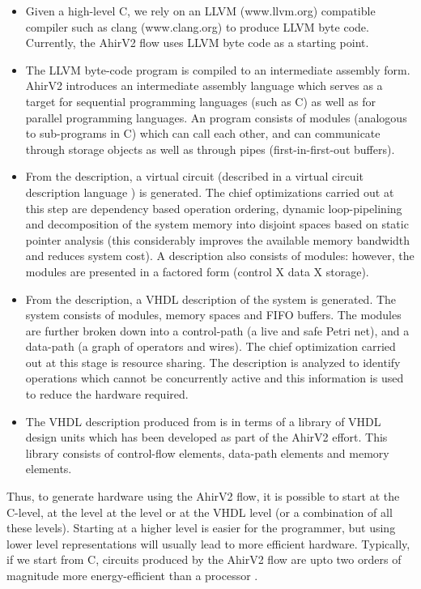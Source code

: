 \begin{itemize}
\item Given a high-level C, we rely on
an LLVM (www.llvm.org) compatible compiler such as clang (www.clang.org)
to produce LLVM byte code.
Currently, the AhirV2 flow uses LLVM byte code as a starting point.
\item The LLVM byte-code program is compiled
to an intermediate assembly form.  AhirV2
introduces an intermediate assembly language
\Aa  which serves as a target for sequential
programming languages (such as C) as
well as for parallel programming languages.
An \Aa program consists of modules (analogous
to sub-programs in C) which can call each 
other, and can communicate through storage objects
as well as through pipes (first-in-first-out buffers).
\item From the \Aa description, a virtual
circuit (described in a virtual circuit
description language \vC) is generated.
The chief optimizations carried out at this
step are dependency based operation
ordering, dynamic loop-pipelining and decomposition of the system memory
into disjoint spaces based on static pointer
analysis (this considerably improves the
available memory bandwidth and reduces
system cost).  A \vC description also
consists of modules: however, the modules
are presented in a factored form (control X data X storage).
\item From the \vC description, a
VHDL description of the system is generated.
The system consists of modules, memory spaces
and FIFO buffers.  The modules are further
broken down into a control-path (a live and safe
Petri net), and a data-path (a graph of operators
and wires).
The chief optimization carried out at this
stage is resource sharing.  The \vC description
is analyzed to identify operations which
cannot be concurrently active and this information
is used to reduce the hardware required.
\item 
The VHDL description produced from 
\vC is in terms of a library
of VHDL design units which has been developed
as part of the AhirV2  effort.  This library
consists of control-flow elements, data-path
elements and memory elements.
\end{itemize}

Thus, to generate hardware using the AhirV2 flow,
it is possible to start at the C-level, at the \Aa level
at the \vC level or at the VHDL level (or a combination
of all these levels).  Starting at a higher level is
easier for the programmer, but using lower level representations
will usually lead to more efficient hardware.
Typically, if we start from C, circuits
produced by the AhirV2 flow are upto two orders of
magnitude more energy-efficient than
a processor \cite{ref:dsd2010}.  

